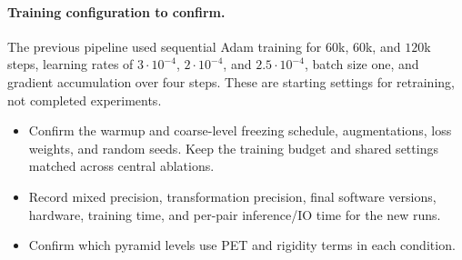\begin{journaladdition}
\paragraph{Training configuration to confirm.}
The previous pipeline used sequential Adam training for $60$k, $60$k, and $120$k steps, learning rates of $3\cdot10^{-4}$, $2\cdot10^{-4}$, and $2.5\cdot10^{-4}$, batch size one, and gradient accumulation over four steps.
These are starting settings for retraining, not completed experiments.
\begin{itemize}
  \item Confirm the warmup and coarse-level freezing schedule, augmentations, loss weights, and random seeds. Keep the training budget and shared settings matched across central ablations.
  \item Record mixed precision, transformation precision, final software versions, hardware, training time, and per-pair inference/IO time for the new runs.
  \item Confirm which pyramid levels use PET and rigidity terms in each condition.
\end{itemize}
\end{journaladdition}
